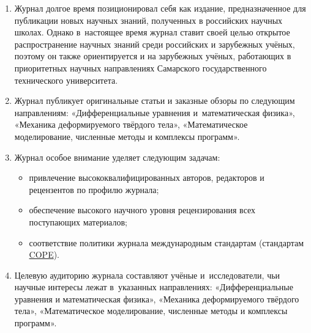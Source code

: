 \begin{enumerate}



\item[1.] Журнал долгое время позиционировал себя как издание, предназначенное для публикации новых научных знаний, полученных в российских научных школах. Однако в~настоящее время журнал ставит своей целью открытое распространение научных знаний среди российских и зарубежных учёных, поэтому он также ориентируется и на зарубежных учёных, работающих в приоритетных научных направлениях Самарского государственного технического университета.



\item[2.] Журнал публикует оригинальные статьи и заказные обзоры по следующим направлениям: «Дифференциальные уравнения и~математическая физика», «Механика деформируемого твёрдого тела», «Математическое моделирование, численные методы и комплексы программ».



\item[3.] Журнал особое внимание уделяет следующим задачам:

\begin{itemize}

\item привлечение высококвалифицированных авторов, редакторов и рецензентов по профилю журнала;

\item обеспечение высокого научного уровня рецензирования всех поступающих материалов;

\item соответствие политики журнала международным стандартам  (стандартам \href{http://publicationethics.org/}{COPE}).

\end{itemize}



\item[4.] Целевую аудиторию журнала составляют учёные и~исследователи, чьи научные интересы лежат в~указанных направлениях: «Дифференциальные уравнения и математическая физика», «Механика деформируемого твёрдого тела», «Математическое моделирование, численные методы и комплексы программ». 



\end{enumerate}



\noindent


